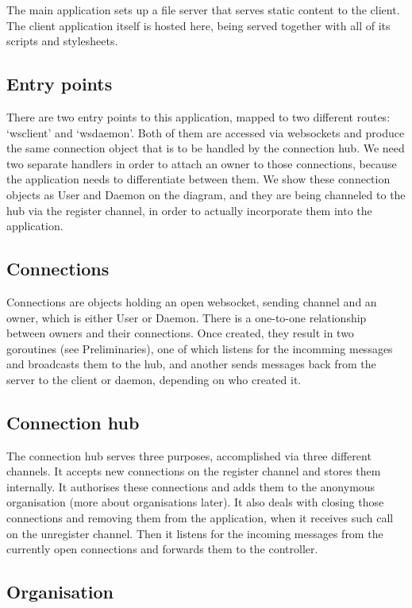 \documentclass{l3proj}
\begin{document}
The main application sets up a file server that serves static content to the client. The client application itself is hosted here, being served together with all of its scripts and stylesheets.

\subsection{Entry points}

There are two entry points to this application, mapped to two different routes: `wsclient' and `wsdaemon'. Both of them are accessed via websockets and produce the same connection object that is to be handled by the connection hub. We need two separate handlers in order to attach an owner to those connections, because the application needs to differentiate between them. We show these connection objects as User and Daemon on the diagram, and they are being channeled to the hub via the register channel, in order to actually incorporate them into the application.

\subsection{Connections}

Connections are objects holding an open websocket, sending channel and an owner, which is either User or Daemon. There is a one-to-one relationship between owners and their connections. Once created, they result in two goroutines (see Preliminaries), one of which listens for the incomming messages and broadcasts them to the hub, and another sends messages back from the server to the client or daemon, depending on who created it.

\subsection{Connection hub}

The connection hub serves three purposes, accomplished via three different channels. It accepts new connections on the register channel and stores them internally. It authorises these connections and adds them to the anonymous organisation (more about organisations later). It also deals with closing those connections and removing them from the application, when it receives such call on the unregister channel. Then it listens for the incoming messages from the currently open connections and forwards them to the controller. 

\subsection{Organisation}
\end{document}

